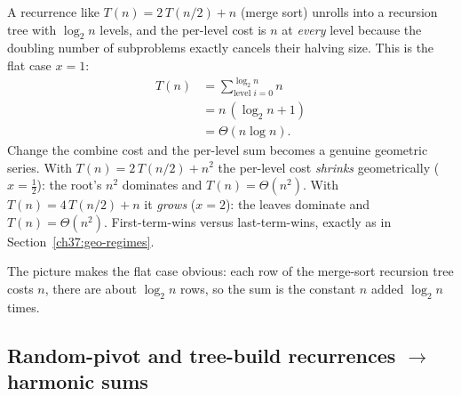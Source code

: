 A recurrence like $T(n) = 2\,T(n/2) + n$ (merge sort) unrolls into a recursion
tree with $\log_2 n$ levels, and the per-level cost is $n$ at \emph{every} level
because the doubling number of subproblems exactly cancels their halving size.
This is the flat case $x = 1$:
\begin{align*}
  T(n) &= \sum_{\text{level } i = 0}^{\log_2 n} n \\
       &= n\,(\log_2 n + 1) \\
       &= \Theta(n \log n).
\end{align*}
Change the combine cost and the per-level sum becomes a genuine geometric series.
With $T(n) = 2\,T(n/2) + n^2$ the per-level cost \emph{shrinks} geometrically
($x = \tfrac12$): the root's $n^2$ dominates and $T(n) = \Theta(n^2)$. With
$T(n) = 4\,T(n/2) + n$ it \emph{grows} ($x = 2$): the leaves dominate and
$T(n) = \Theta(n^2)$. First-term-wins versus last-term-wins, exactly as in
Section~\ref{ch37:geo-regimes}.

\begin{center}
\end{center}

The picture makes the flat case obvious: each row of the merge-sort recursion tree
costs $n$, there are about $\log_2 n$ rows, so the sum is the constant $n$ added
$\log_2 n$ times.

\subsection{Random-pivot and tree-build recurrences \texorpdfstring{$\to$}{lead to} harmonic sums}

